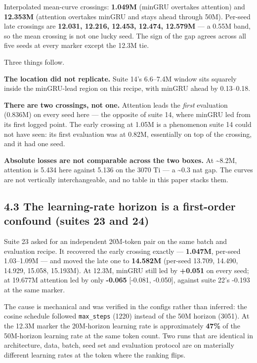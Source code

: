 Interpolated mean-curve crossings: \textbf{1.049M} (minGRU overtakes attention) and \textbf{12.353M}
(attention overtakes minGRU and stays ahead through 50M). Per-seed late crossings are
\textbf{12.031, 12.216, 12.453, 12.474, 12.579M} --- a 0.55M band, so the mean crossing is not one lucky
seed. The sign of the gap agrees across all five seeds at every marker except the 12.3M tie.

Three things follow.

\textbf{The location did not replicate.} Suite 14's 6.6--7.4M window sits squarely inside the
minGRU-lead region on this recipe, with minGRU ahead by 0.13--0.18.

\textbf{There are two crossings, not one.} Attention leads the \emph{first} evaluation (0.836M) on every
seed here --- the opposite of suite 14, where minGRU led from its first logged point. The early
crossing at 1.05M is a phenomenon suite 14 could not have seen: its first evaluation was at 0.82M,
essentially on top of the crossing, and it had one seed.

\textbf{Absolute losses are not comparable across the two boxes.} At \textasciitilde8.2M, attention is 5.434 here
against 5.136 on the 3070 Ti --- a \textasciitilde0.3 nat gap. The curves are not vertically interchangeable, and
no table in this paper stacks them.

\subsection{4.3 The learning-rate horizon is a first-order confound (suites 23 and 24)}\label{the-learning-rate-horizon-is-a-first-order-confound-suites-23-and-24}

Suite 23 asked for an independent 20M-token pair on the same batch and evaluation recipe. It
recovered the early crossing exactly --- \textbf{1.047M}, per-seed 1.03--1.09M --- and moved the late one to
\textbf{14.582M} (per-seed 13.709, 14.490, 14.929, 15.058, 15.193M). At 12.3M, minGRU still led by
\textbf{+0.051} on every seed; at 19.677M attention led by only \textbf{-0.065} {[}-0.081, -0.050{]}, against
suite 22's -0.193 at the same marker.

The cause is mechanical and was verified in the configs rather than inferred: the cosine schedule
followed \texttt{max\_steps} (1220) instead of the 50M horizon (3051). At the 12.3M marker the
20M-horizon learning rate is approximately \textbf{47\%} of the 50M-horizon learning rate at the same
token count. Two runs that are identical in architecture, data, batch, seed set and evaluation
protocol are on materially different learning rates at the token where the ranking flips.

